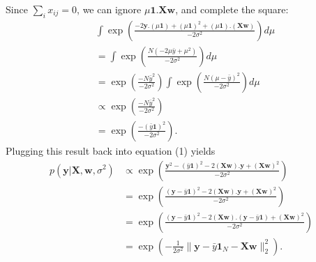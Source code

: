 \documentclass[a4paper,11pt]{article}
\begin{document}
Since $\sum_ix_{ij}=0$, we can ignore $\mu\mathbf{1}.\mathbf{Xw}$, and complete the square:
\begin{align*}
	&\int\exp\left(
		\frac{-2\mathbf{y}.(\mu\mathbf{1})
		+ (\mu\mathbf{1})^2
		+ (\mu\mathbf{1}).(\mathbf{Xw})} {-2\sigma^2}
	\right)d\mu \\
	&=\int\exp\left(
		\frac{N(-2\mu\bar{y}
		+ \mu^2)}{-2\sigma^2}
	\right)d\mu\\
	&= \exp\left(
		\frac{-N\bar{y}^2}{-2\sigma^2}
	\right) \int\exp\left(
		\frac{N(\mu - \bar{y})^2}{-2\sigma^2}
	\right)d\mu\\
	&\propto \exp\left(\frac{-N\bar{y}^2}{-2\sigma^2}\right) \\
	&= \exp\left(
		\frac{-(\bar{y}\mathbf{1})^2}{-2\sigma^2}
	\right).
\end{align*}
Plugging this result back into equation (1) yields
\begin{align*}
	p(\mathbf{y}|\mathbf{X}, \mathbf{w}, \sigma^2) &
	\propto \exp\left(
		\frac{
			\mathbf{y}^2 - (\bar{y}\mathbf{1})^2 - 2(\mathbf{Xw}).\mathbf{y} + (\mathbf{Xw})^2
		}{-2\sigma^2}
	\right) \\
	&= \exp\left(
		\frac{
			(\mathbf{y}-\bar{y}\mathbf{1})^2 - 2(\mathbf{Xw}).\mathbf{y} + (\mathbf{Xw})^2
		}{-2\sigma^2}
	\right) \\
	&= \exp\left(
		\frac{
			(\mathbf{y}-\bar{y}\mathbf{1})^2
			- 2(\mathbf{Xw}) . (\mathbf{y} - \bar{y}\mathbf{1})
			+ (\mathbf{Xw})^2
		}{-2\sigma^2}
	\right) \\
	& = \exp\left(
		-\frac1{2\sigma^2}\lVert\mathbf{y} - \bar{y}\mathbf{1}_N - \mathbf{Xw}\rVert_2^2
	\right).
\end{align*}
\end{document}
